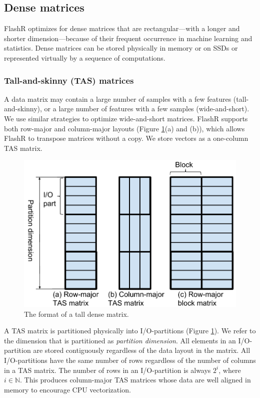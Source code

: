 \subsection{Dense matrices}
FlashR optimizes for dense matrices that are rectangular---with
a longer and shorter dimension---because of their frequent occurrence
in machine learning and statistics. Dense matrices can be stored
physically in memory or on SSDs or represented virtually by a sequence of
computations.

\subsubsection{Tall-and-skinny (TAS) matrices}
A data matrix may contain a large number of samples with a few features
(tall-and-skinny),
or a large number of features with a few samples (wide-and-short).
We use similar strategies to optimize wide-and-short matrices. FlashR
supports both row-major and column-major layouts (Figure \ref{fig:den_mat}(a)
and (b)), which allows FlashR to transpose matrices without a copy.
We store vectors as a one-column TAS matrix.

\begin{figure}
	\centering
	\includegraphics[scale=0.5]{FlashMatrix_figs/dense_matrix2.pdf}
	\vspace{-5pt}
	\caption{The format of a tall dense matrix.}
	\label{fig:den_mat}
  \vspace{-12pt}
\end{figure}

A TAS matrix is partitioned physically into I/O-partitions (Figure
\ref{fig:den_mat}). We refer to the dimension that is partitioned as
\textit{partition dimension}. All elements in an I/O-partition are stored
contiguously regardless of the data layout in the matrix. All I/O-partitions
have the same number of rows regardless of the number of columns in a TAS
matrix. The number of rows in an I/O-partition is always $2^i$, where
$i \in \mathbb{N}$. This produces column-major TAS
matrices whose data are well aligned in memory to encourage CPU vectorization.

